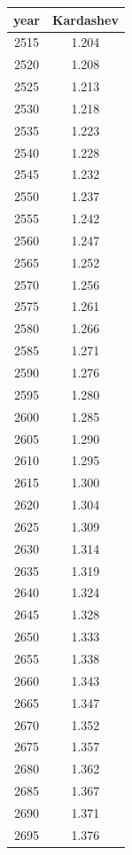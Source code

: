 \documentclass[a4paper]{article}
\begin{document}
	\begin{tabular}{|c|c|}
		\hline
		year & Kardashev \\
		\hline
		2515 & 1.204 \\
		\hline
		2520 & 1.208 \\
		\hline
		2525 & 1.213 \\
		\hline
		2530 & 1.218 \\
		\hline
		2535 & 1.223 \\
		\hline
		2540 & 1.228 \\
		\hline
		2545 & 1.232 \\
		\hline
		2550 & 1.237 \\
		\hline
		2555 & 1.242 \\
		\hline
		2560 & 1.247 \\
		\hline
		2565 & 1.252 \\
		\hline
		2570 & 1.256 \\
		\hline
		2575 & 1.261 \\
		\hline
		2580 & 1.266 \\
		\hline
		2585 & 1.271 \\
		\hline
		2590 & 1.276 \\
		\hline
		2595 & 1.280 \\
		\hline
		2600 & 1.285 \\
		\hline
		2605 & 1.290 \\
		\hline
		2610 & 1.295 \\
		\hline
		2615 & 1.300 \\
		\hline
		2620 & 1.304 \\
		\hline
		2625 & 1.309 \\
		\hline
		2630 & 1.314 \\
		\hline
		2635 & 1.319 \\
		\hline
		2640 & 1.324 \\
		\hline
		2645 & 1.328 \\
		\hline
		2650 & 1.333 \\
		\hline
		2655 & 1.338 \\
		\hline
		2660 & 1.343 \\
		\hline
		2665 & 1.347 \\
		\hline
		2670 & 1.352 \\
		\hline
		2675 & 1.357 \\
		\hline
		2680 & 1.362 \\
		\hline
		2685 & 1.367 \\
		\hline
		2690 & 1.371 \\
		\hline
		2695 & 1.376 \\

\end{tabular}
\end{document}
